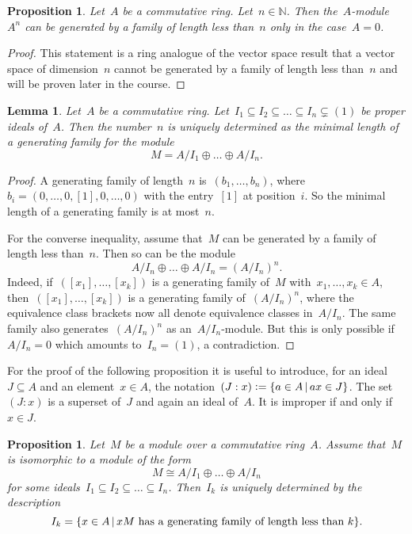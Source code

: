 \documentclass[12pt]{scrartcl}
\theoremstyle{definition}
\theoremstyle{plain}
\newtheorem{proposition}[definition]{Proposition}
\newtheorem{lemma}[definition]{Lemma}
\theoremstyle{remark}
\newcommand{\defeq}{\vcentcolon=}
\begin{document}
\begin{proposition}
    Let~$A$ be a commutative ring. Let~$n \in \mathbb{N}$. Then the~$A$-module~$A^n$ can be generated by a family of length less than~$n$ only in the case~$A = 0$.
\end{proposition}

\begin{proof}
    This statement is a ring analogue of the vector space result that a vector space of dimension~$n$ cannot be generated by a family of length less than~$n$ and will be proven later in the course.
\end{proof}

\begin{lemma}\label{lemma:rank}
    Let~$A$ be a commutative ring.
    Let~$I_1 \subseteq I_2 \subseteq \ldots \subseteq I_n \subsetneq (1)$ be proper ideals of~$A$. Then the number~$n$ is uniquely determined as the minimal length of a generating family for the module
    \[ M = A/I_1 \oplus \ldots \oplus A/I_n. \]
\end{lemma}

\begin{proof}
    A generating family of length~$n$ is~$(b_1,\ldots,b_n)$, where~$b_i = (0,\ldots,0,[1],0,\ldots,0)$ with the entry~$[1]$ at position~$i$. So the minimal length of a generating family is at most~$n$.

    For the converse inequality, assume that~$M$ can be generated by a family of length less than~$n$. Then so can be the module
    \[ A/I_n \oplus \ldots \oplus A/I_n = (A/I_n)^n. \]
    Indeed, if~$([x_1],\ldots,[x_k])$ is a generating family of~$M$ with~$x_1,\ldots,x_k \in A$, then~$([x_1],\ldots,[x_k])$ is a generating family of~$(A/I_n)^n$, where the equivalence class brackets now all denote equivalence classes in~$A/I_n$. The same family also generates~$(A/I_n)^n$ as an~$A/I_n$-module. But this is only possible if~$A/I_n = 0$ which amounts to~$I_n = (1)$, a contradiction.
\end{proof}

For the proof of the following proposition it is useful to introduce, for an ideal~$J \subseteq A$ and an element~$x \in A$, the notation~$(J : x) \defeq \{ a \in A \,|\, ax \in J \}$. The set~$(J : x)$ is a superset of~$J$ and again an ideal of~$A$. It is improper if and only if~$x \in J$.

\begin{proposition}
    Let~$M$ be a module over a commutative ring~$A$. Assume that~$M$ is isomorphic to a module of the form
    \[ M \cong A/I_1 \oplus \ldots \oplus A/I_n \]
    for some ideals~$I_1 \subseteq I_2 \subseteq \ldots \subseteq I_n$. Then~$I_k$ is uniquely determined by the description
    \[ I_k = \{ x \in A \,|\, \text{\textnormal{$xM$ has a generating family of length less than~$k$}} \}. \]
\end{proposition}
\end{document}
